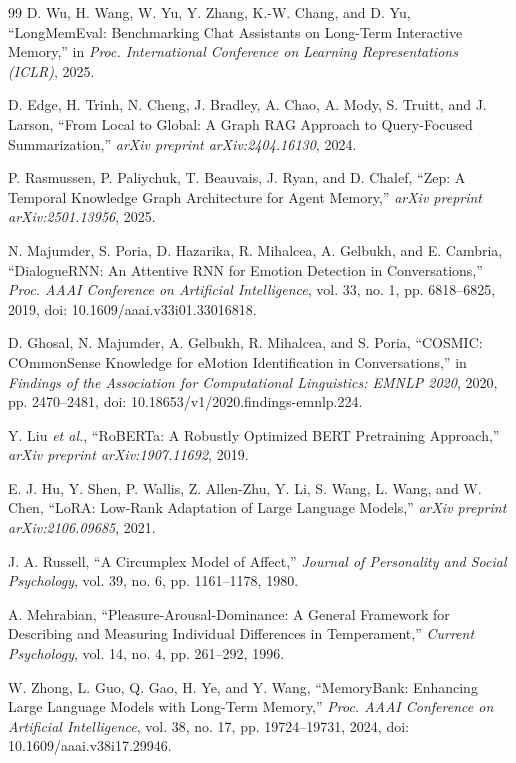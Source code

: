 \documentclass[graybox]{svmult}
\begin{document}
\begin{thebibliography}{99}
D. Wu, H. Wang, W. Yu, Y. Zhang, K.-W. Chang, and D. Yu,
``LongMemEval: Benchmarking Chat Assistants on Long-Term Interactive
Memory,'' in \textit{Proc. International Conference on Learning
Representations (ICLR)}, 2025.

D. Edge, H. Trinh, N. Cheng, J. Bradley, A. Chao, A. Mody, S. Truitt,
and J. Larson, ``From Local to Global: A Graph RAG Approach to
Query-Focused Summarization,'' \textit{arXiv preprint arXiv:2404.16130},
2024.

P. Rasmussen, P. Paliychuk, T. Beauvais, J. Ryan, and D. Chalef,
``Zep: A Temporal Knowledge Graph Architecture for Agent Memory,''
\textit{arXiv preprint arXiv:2501.13956}, 2025.

N. Majumder, S. Poria, D. Hazarika, R. Mihalcea, A. Gelbukh, and
E. Cambria, ``DialogueRNN: An Attentive RNN for Emotion Detection in
Conversations,'' \textit{Proc. AAAI Conference on Artificial Intelligence},
vol. 33, no. 1, pp. 6818--6825, 2019,
doi: 10.1609/aaai.v33i01.33016818.

D. Ghosal, N. Majumder, A. Gelbukh, R. Mihalcea, and S. Poria,
``COSMIC: COmmonSense Knowledge for eMotion Identification in
Conversations,'' in \textit{Findings of the Association for Computational
Linguistics: EMNLP 2020}, 2020, pp. 2470--2481,
doi: 10.18653/v1/2020.findings-emnlp.224.

Y. Liu \textit{et al.}, ``RoBERTa: A Robustly Optimized BERT Pretraining
Approach,'' \textit{arXiv preprint arXiv:1907.11692}, 2019.

E. J. Hu, Y. Shen, P. Wallis, Z. Allen-Zhu, Y. Li, S. Wang, L. Wang,
and W. Chen, ``LoRA: Low-Rank Adaptation of Large Language Models,''
\textit{arXiv preprint arXiv:2106.09685}, 2021.

J. A. Russell, ``A Circumplex Model of Affect,'' \textit{Journal of
Personality and Social Psychology}, vol. 39, no. 6, pp. 1161--1178, 1980.

A. Mehrabian, ``Pleasure-Arousal-Dominance: A General Framework for
Describing and Measuring Individual Differences in Temperament,''
\textit{Current Psychology}, vol. 14, no. 4, pp. 261--292, 1996.

W. Zhong, L. Guo, Q. Gao, H. Ye, and Y. Wang, ``MemoryBank: Enhancing
Large Language Models with Long-Term Memory,'' \textit{Proc. AAAI
Conference on Artificial Intelligence}, vol. 38, no. 17,
pp. 19724--19731, 2024, doi: 10.1609/aaai.v38i17.29946.


\end{thebibliography}
\end{document}
